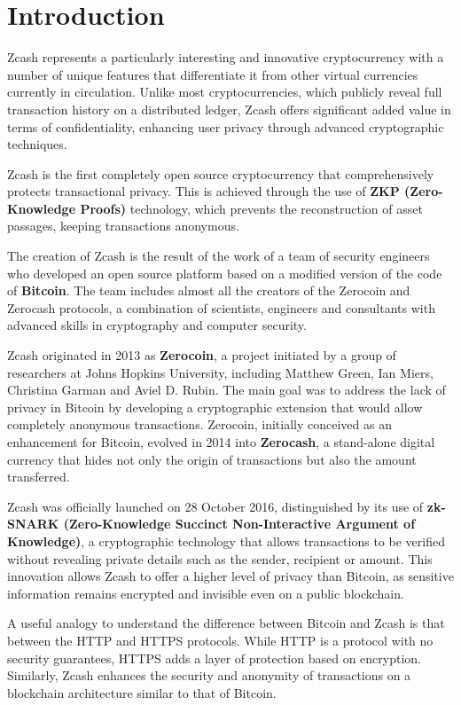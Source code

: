 \section{Introduction}
Zcash represents a particularly interesting and innovative cryptocurrency with a number of unique features that differentiate it from other virtual currencies currently in circulation. Unlike most cryptocurrencies, which publicly reveal full transaction history on a distributed ledger, Zcash offers significant added value in terms of confidentiality, enhancing user privacy through advanced cryptographic techniques.

\noindent Zcash is the first completely open source cryptocurrency that comprehensively protects transactional privacy. This is achieved through the use of \textbf{ZKP (Zero-Knowledge Proofs)} technology, which prevents the reconstruction of asset passages, keeping transactions anonymous.

\noindent The creation of Zcash is the result of the work of a team of security engineers who developed an open source platform based on a modified version of the code of \textbf{Bitcoin}. The team includes almost all the creators of the Zerocoin and Zerocash protocols, a combination of scientists, engineers and consultants with advanced skills in cryptography and computer security.

\noindent Zcash originated in 2013 as \textbf{Zerocoin}, a project initiated by a group of researchers at Johns Hopkins University, including Matthew Green, Ian Miers, Christina Garman and Aviel D. Rubin. The main goal was to address the lack of privacy in Bitcoin by developing a cryptographic extension that would allow completely anonymous transactions. Zerocoin, initially conceived as an enhancement for Bitcoin, evolved in 2014 into \textbf{Zerocash}, a stand-alone digital currency that hides not only the origin of transactions but also the amount transferred.

\noindent Zcash was officially launched on 28 October 2016, distinguished by its use of \textbf{zk-SNARK (Zero-Knowledge Succinct Non-Interactive Argument of Knowledge)}, a cryptographic technology that allows transactions to be verified without revealing private details such as the sender, recipient or amount. This innovation allows Zcash to offer a higher level of privacy than Bitcoin, as sensitive information remains encrypted and invisible even on a public blockchain.

\noindent A useful analogy to understand the difference between Bitcoin and Zcash is that between the HTTP and HTTPS protocols. While HTTP is a protocol with no security guarantees, HTTPS adds a layer of protection based on encryption. Similarly, Zcash enhances the security and anonymity of transactions on a blockchain architecture similar to that of Bitcoin.

